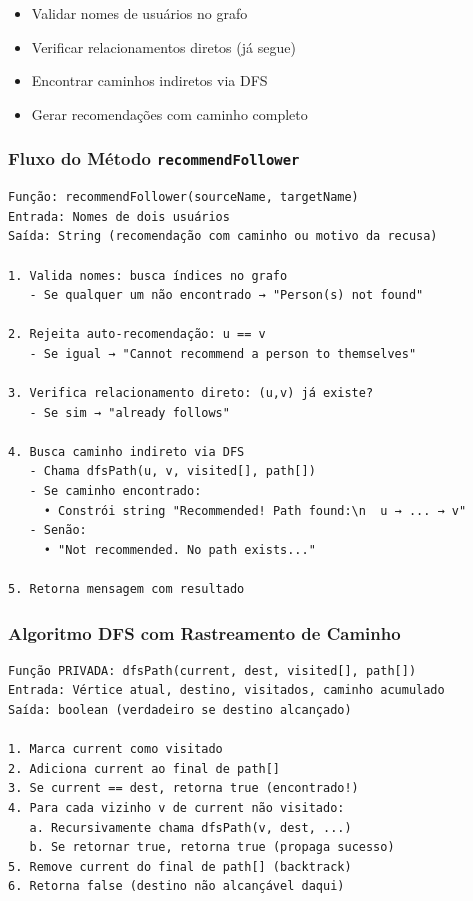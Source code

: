 \documentclass[12pt,a4paper]{article}
\begin{document}
\begin{itemize}
    \item Validar nomes de usuários no grafo
    \item Verificar relacionamentos diretos (já segue)
    \item Encontrar caminhos indiretos via DFS
    \item Gerar recomendações com caminho completo
\end{itemize}

\subsubsection{Fluxo do Método \texttt{recommendFollower}}

\begin{verbatim}
Função: recommendFollower(sourceName, targetName)
Entrada: Nomes de dois usuários
Saída: String (recomendação com caminho ou motivo da recusa)

1. Valida nomes: busca índices no grafo
   - Se qualquer um não encontrado → "Person(s) not found"

2. Rejeita auto-recomendação: u == v
   - Se igual → "Cannot recommend a person to themselves"

3. Verifica relacionamento direto: (u,v) já existe?
   - Se sim → "already follows"

4. Busca caminho indireto via DFS
   - Chama dfsPath(u, v, visited[], path[])
   - Se caminho encontrado:
     • Constrói string "Recommended! Path found:\n  u → ... → v"
   - Senão:
     • "Not recommended. No path exists..."

5. Retorna mensagem com resultado
\end{verbatim}

\subsubsection{Algoritmo DFS com Rastreamento de Caminho}

\begin{verbatim}
Função PRIVADA: dfsPath(current, dest, visited[], path[])
Entrada: Vértice atual, destino, visitados, caminho acumulado
Saída: boolean (verdadeiro se destino alcançado)

1. Marca current como visitado
2. Adiciona current ao final de path[]
3. Se current == dest, retorna true (encontrado!)
4. Para cada vizinho v de current não visitado:
   a. Recursivamente chama dfsPath(v, dest, ...)
   b. Se retornar true, retorna true (propaga sucesso)
5. Remove current do final de path[] (backtrack)
6. Retorna false (destino não alcançável daqui)
\end{verbatim}
\end{document}
